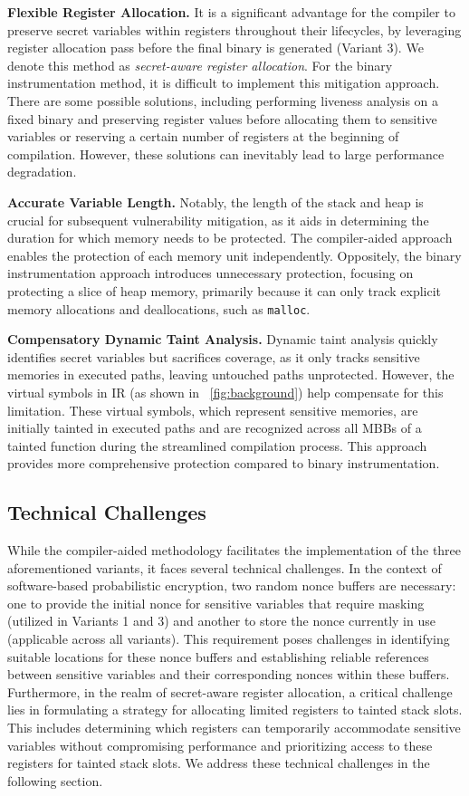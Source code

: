 \noindent\textbf{Flexible Register Allocation.}
It is a significant advantage for the compiler to preserve secret variables within registers throughout their lifecycles, by leveraging register allocation pass before the final binary is generated (Variant 3).
We denote this method as \textit{secret-aware register allocation}.
For the binary instrumentation method, it is difficult to implement this mitigation approach.
There are some possible solutions, including performing liveness analysis on a fixed binary and preserving register values before allocating them to sensitive variables or reserving a certain number of registers at the beginning of compilation.
However, these solutions can inevitably lead to large performance degradation.

\noindent\textbf{Accurate Variable Length.}
Notably, the length of the stack and heap is crucial for subsequent vulnerability mitigation, as it aids in determining the duration for which memory needs to be protected. 
The compiler-aided approach enables the protection of each memory unit independently.
Oppositely, the binary instrumentation approach introduces unnecessary protection, focusing on protecting a slice of heap memory, primarily because it can only track explicit memory allocations and deallocations, such as \texttt{malloc}.

\noindent\textbf{Compensatory Dynamic Taint Analysis.}
Dynamic taint analysis quickly identifies secret variables but sacrifices coverage, as it only tracks sensitive memories in executed paths, leaving untouched paths unprotected. 
However, the virtual symbols in IR (as shown in \F~\ref{fig:background}) help compensate for this limitation. 
These virtual symbols, which represent sensitive memories, are initially tainted in executed paths and are recognized across all MBBs of a tainted function during the streamlined compilation process. 
This approach provides more comprehensive protection compared to binary instrumentation.

\subsection{Technical Challenges}
\label{subsec:challenges}

While the compiler-aided methodology facilitates the implementation of the three aforementioned variants, it faces several technical challenges. 
In the context of software-based probabilistic encryption, two random nonce buffers are necessary: one to provide the initial nonce for sensitive variables that require masking (utilized in Variants 1 and 3) and another to store the nonce currently in use (applicable across all variants). 
This requirement poses challenges in identifying suitable locations for these nonce buffers and establishing reliable references between sensitive variables and their corresponding nonces within these buffers. 
Furthermore, in the realm of secret-aware register allocation, a critical challenge lies in formulating a strategy for allocating limited registers to tainted stack slots. 
This includes determining which registers can temporarily accommodate sensitive variables without compromising performance and prioritizing access to these registers for tainted stack slots. 
We address these technical challenges in the following section.

